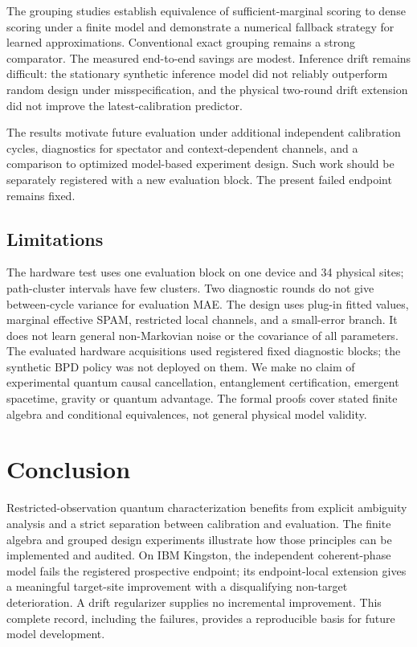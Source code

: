 \documentclass[11pt,a4paper]{article}
\begin{document}
The grouping studies establish equivalence of sufficient-marginal scoring to dense scoring under a finite model and demonstrate a numerical fallback strategy for learned approximations. Conventional exact grouping remains a strong comparator. The measured end-to-end savings are modest. Inference drift remains difficult: the stationary synthetic inference model did not reliably outperform random design under misspecification, and the physical two-round drift extension did not improve the latest-calibration predictor.

The results motivate future evaluation under additional independent calibration cycles, diagnostics for spectator and context-dependent channels, and a comparison to optimized model-based experiment design. Such work should be separately registered with a new evaluation block. The present failed endpoint remains fixed.

\subsection{Limitations}

The hardware test uses one evaluation block on one device and 34 physical sites; path-cluster intervals have few clusters. Two diagnostic rounds do not give between-cycle variance for evaluation MAE. The design uses plug-in fitted values, marginal effective SPAM, restricted local channels, and a small-error branch. It does not learn general non-Markovian noise or the covariance of all parameters. The evaluated hardware acquisitions used registered fixed diagnostic blocks; the synthetic BPD policy was not deployed on them. We make no claim of experimental quantum causal cancellation, entanglement certification, emergent spacetime, gravity or quantum advantage. The formal proofs cover stated finite algebra and conditional equivalences, not general physical model validity.

\section{Conclusion}

Restricted-observation quantum characterization benefits from explicit ambiguity analysis and a strict separation between calibration and evaluation. The finite algebra and grouped design experiments illustrate how those principles can be implemented and audited. On IBM Kingston, the independent coherent-phase model fails the registered prospective endpoint; its endpoint-local extension gives a meaningful target-site improvement with a disqualifying non-target deterioration. A drift regularizer supplies no incremental improvement. This complete record, including the failures, provides a reproducible basis for future model development.
\end{document}
